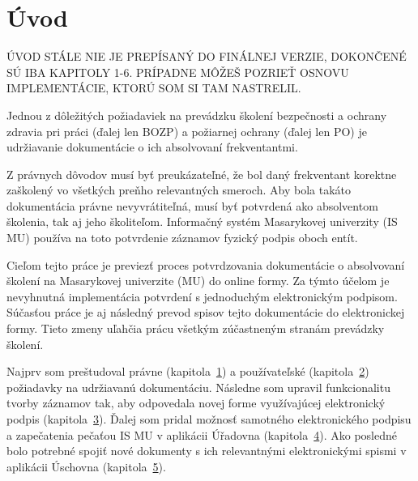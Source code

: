 \documentclass[
  digital,     %
  oneside,     %
  nosansbold,  %
  nocolorbold, %
  lof,         %
  nolot,         %
]{fithesis4}
\begin{document}
\chapter*{Úvod}
\label{chap:intro}

ÚVOD STÁLE NIE JE PREPÍSANÝ DO FINÁLNEJ VERZIE, DOKONČENÉ SÚ IBA KAPITOLY 1-6. PRÍPADNE MÔŽEŠ POZRIEŤ OSNOVU IMPLEMENTÁCIE, KTORÚ SOM SI TAM NASTRELIL.

Jednou z dôležitých požiadaviek na prevádzku školení bezpečnosti a ochrany zdravia pri práci (ďalej len BOZP) a požiarnej ochrany (ďalej len PO) je udržiavanie dokumentácie o ich absolvovaní frekventantmi.

Z právnych dôvodov musí byť preukázateľné, že bol daný frekventant korektne zaškolený vo všetkých preňho relevantných smeroch. Aby bola takáto dokumentácia právne nevyvrátiteľná, musí byť potvrdená ako absolventom školenia, tak aj jeho školiteľom. Informačný systém Masarykovej univerzity (IS MU) používa na toto potvrdenie záznamov fyzický podpis oboch entít.

Cieľom tejto práce je previezť proces potvrdzovania dokumentácie o absolvovaní školení na Masarykovej univerzite (MU) do online formy. Za týmto účelom je nevyhnutná implementácia potvrdení s jednoduchým elektronickým podpisom. Súčasťou práce je aj následný prevod spisov tejto dokumentácie do elektronickej formy. Tieto zmeny uľahčia prácu všetkým zúčastneným stranám prevádzky školení.

Najprv som preštudoval právne (kapitola~\hyperref[kap-1]{1}) a používateľské (kapitola~\hyperref[kap-1]{2}) požiadavky na udržiavanú dokumentáciu. Následne som upravil funkcionalitu tvorby záznamov tak, aby odpovedala novej forme využívajúcej elektronický podpis (kapitola~\hyperref[kap-1]{3}). Ďalej som pridal možnosť samotného elektronického podpisu a zapečatenia pečaťou IS MU v aplikácii Úřadovna (kapitola~\hyperref[kap-1]{4}). Ako posledné bolo potrebné spojiť nové dokumenty s ich relevantnými elektronickými spismi v aplikácii Úschovna (kapitola~\hyperref[kap-1]{5}).
\end{document}
